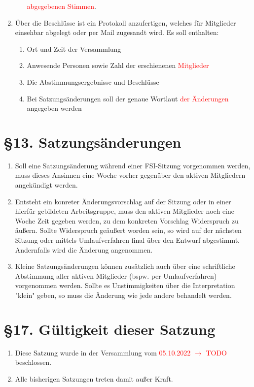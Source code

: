 \documentclass[a4paper,12pt]{article}
\newcommand{\red}[1]{\textcolor{red}{#1}}
\begin{document}
\begin{enumerate}
\begin{enumerate}[label=(\roman*)]
		\red{abgegebenen Stimmen}.
	\end{enumerate}
	\item
	Über die Beschlüsse ist ein Protokoll anzufertigen, welches für
	Mitglieder einsehbar abgelegt oder per Mail zugesandt wird.
	Es soll enthalten:
	\begin{enumerate}[label=(\roman*)]
		\item
		Ort und Zeit der Versammlung
		\item
		Anwesende Personen sowie Zahl der erschienenen
		\red{Mitglieder}
		\item
		Die Abstimmungsergebnisse und Beschlüsse
		\item
		Bei Satzungsänderungen soll der genaue Wortlaut
		\red{der Änderungen} angegeben werden
	\end{enumerate}
\end{enumerate}


\section*{§13. Satzungsänderungen}
\begin{enumerate}
	\item
		Soll eine Satzungsänderung während einer FSI-Sitzung
		vorgenommen werden, muss dieses Ansinnen eine Woche vorher
		gegenüber den aktiven Mitgliedern angekündigt werden.
	\item
		Entsteht ein konreter Änderungsvorschlag auf der Sitzung oder in
		einer hierfür gebildeten Arbeitsgruppe, muss den aktiven
		Mitglieder noch eine Woche Zeit gegeben werden, zu dem konkreten
		Vorschlag Widerspruch zu äußern.
		Sollte Widerspruch geäußert worden sein, so wird auf der
		nächsten Sitzung oder mittels Umlaufverfahren final über den
		Entwurf abgestimmt. Andernfalls wird die Änderung angenommen.
	\item
		Kleine Satzungsänderungen können zusätzlich
		auch über eine schriftliche Abstimmung aller
		aktiven Mitglieder (bspw. per Umlaufverfahren)
		vorgenommen werden. Sollte es Unstimmigkeiten über die
		Interpretation "klein" geben, so muss die Änderung wie jede
		andere behandelt werden.
\end{enumerate}



\section*{§17. Gültigkeit dieser Satzung}

\begin{enumerate}
	\item
		Diese Satzung wurde in der Versammlung vom \red{05.10.2022 $\rightarrow$ TODO}
		beschlossen.
	\item
		Alle bisherigen Satzungen treten damit außer Kraft.
\end{enumerate}
\end{document}
